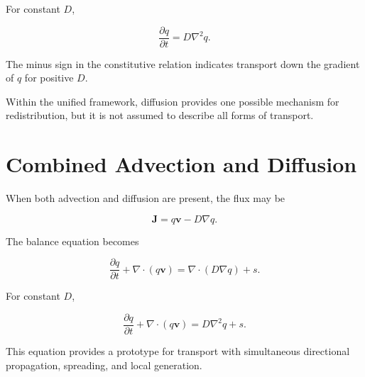 \documentclass[12pt,oneside]{book}
\begin{document}
For constant \(D\),

\begin{equation}
    \frac{\partial q}{\partial t}
    =
    D\nabla^2 q.
    \label{eq:diffusion-equation}
\end{equation}

The minus sign in the constitutive relation indicates transport
down the gradient of \(q\) for positive \(D\).

Within the unified framework, diffusion provides one possible
mechanism for redistribution, but it is not assumed to describe
all forms of transport.


\section{Combined Advection and Diffusion}
\label{sec:advection-diffusion}

When both advection and diffusion are present, the flux may be

\begin{equation}
    \mathbf{J}
    =
    q\mathbf{v}
    -
    D\nabla q.
    \label{eq:advection-diffusion-flux}
\end{equation}

The balance equation becomes

\begin{equation}
    \frac{\partial q}{\partial t}
    +
    \nabla\cdot
    \left(
        q\mathbf{v}
    \right)
    =
    \nabla\cdot
    \left(
        D\nabla q
    \right)
    +
    s.
    \label{eq:advection-diffusion-source}
\end{equation}

For constant \(D\),

\begin{equation}
    \frac{\partial q}{\partial t}
    +
    \nabla\cdot
    \left(
        q\mathbf{v}
    \right)
    =
    D\nabla^2q
    +
    s.
    \label{eq:advection-diffusion-constant}
\end{equation}

This equation provides a prototype for transport with
simultaneous directional propagation, spreading, and local
generation.

\end{document}

